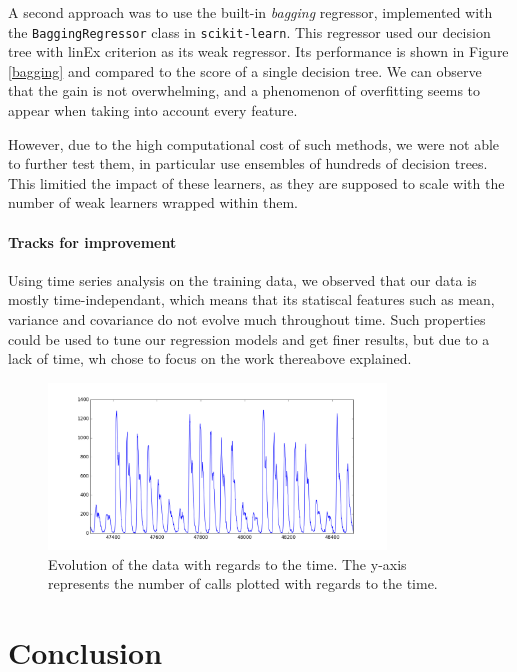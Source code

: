 \documentclass[a4paper,10pt]{article}
\begin{document}
  A second approach was to use the built-in \emph{bagging} regressor, implemented with the {\tt BaggingRegressor} class in {\tt scikit-learn}. This regressor used our decision tree with linEx criterion as its weak regressor. Its performance is shown in Figure \ref{bagging} and compared to the score of a single decision tree. We can observe that the gain is not overwhelming, and a phenomenon of overfitting seems to appear when taking into account every feature.

  However, due to the high computational cost of such methods, we were not able to further test them, in particular use ensembles of hundreds of decision trees. This limitied the impact of these learners, as they are supposed to scale with the number of weak learners wrapped within them.

  \subsection{Tracks for improvement}

  Using time series analysis on the training data, we observed that our data is mostly time-independant, which means that its statiscal features such as mean, variance and covariance do not evolve much throughout time. Such properties could be used to tune our regression models and get finer results, but due to a lack of time, wh chose to focus on the work thereabove explained.

  \begin{figure}
    \centering
    \includegraphics[width=0.8\textwidth]{graphics/3-Time_series.png}
    \caption{Evolution of the data with regards to the time. The y-axis represents the number of calls plotted with regards to the time.}
    \label{time_series}
  \end{figure}

\part{Conclusion}
\end{document}
